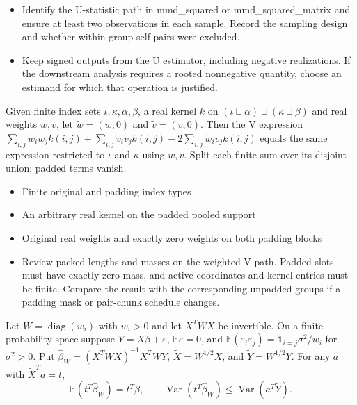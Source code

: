 \expandafter\def\csname statadic@diagnostics@STATADIC-MMD-005\endcsname{\begin{itemize}
\item Identify the U-statistic path in mmd\_squared or mmd\_squared\_matrix and ensure at least two observations in each sample. Record the sampling design and whether within-group self-pairs were excluded.
\item Keep signed outputs from the U estimator, including negative realizations. If the downstream analysis requires a rooted nonnegative quantity, choose an estimand for which that operation is justified.
\end{itemize}}
\expandafter\def\csname statadic@statement@STATADIC-MMD-006\endcsname{Given finite index sets $\iota,\kappa,\alpha,\beta$, a real
  kernel $k$ on $(\iota\sqcup\alpha)\sqcup(\kappa\sqcup\beta)$ and real weights
  $w,v$, let $\tilde w=(w,0)$ and $\tilde v=(v,0)$. Then the V expression
  $\sum_{i,j}\tilde w_i\tilde w_jk(i,j)+\sum_{i,j}\tilde v_i\tilde v_jk(i,j)-2\sum_{i,j}\tilde w_i\tilde v_jk(i,j)$
  equals the same expression restricted to $\iota$ and $\kappa$ using $w,v$.}
\expandafter\def\csname statadic@proof@STATADIC-MMD-006\endcsname{Split each finite sum over its disjoint union; padded terms vanish.}
\expandafter\def\csname statadic@assumptions@STATADIC-MMD-006\endcsname{\begin{itemize}
\item Finite original and padding index types
\item An arbitrary real kernel on the padded pooled support
\item Original real weights and exactly zero weights on both padding blocks
\end{itemize}}
\expandafter\def\csname statadic@diagnostics@STATADIC-MMD-006\endcsname{\begin{itemize}
\item Review packed lengths and masses on the weighted V path. Padded slots must have exactly zero mass, and active coordinates and kernel entries must be finite. Compare the result with the corresponding unpadded groups if a padding mask or pair-chunk schedule changes.
\end{itemize}}
\expandafter\def\csname statadic@statement@STATADIC-LINEAR-006\endcsname{Let $W=\operatorname{diag}(w_i)$ with $w_i>0$ and let
  $X^TWX$ be invertible. On a finite probability space suppose
  $Y=X\beta+\varepsilon$, $\mathbb E\varepsilon=0$, and
  $\mathbb E(\varepsilon_i\varepsilon_j)=\mathbf 1_{i=j}\sigma^2/w_i$
  for $\sigma^2>0$. Put $\hat\beta_W=(X^TWX)^{-1}X^TWY$,
  $\widetilde X=W^{1/2}X$, and $\widetilde Y=W^{1/2}Y$.
  For any $a$ with $\widetilde X^Ta=t$,
  \[\mathbb E(t^T\hat\beta_W)=t^T\beta,\qquad
  \operatorname{Var}(t^T\hat\beta_W)\leq\operatorname{Var}(a^T\widetilde Y).\]}
